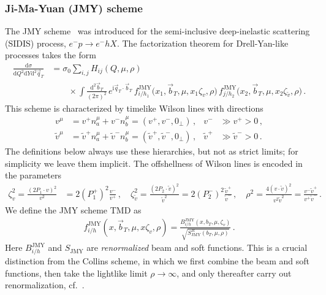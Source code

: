 \documentclass[11pt,a4paper]{article}
\newcommand{\df}{\mathrm{d}}
\newcommand{\img}{\mathrm{i}}
\newcommand{\nn}{\nonumber}
\newcommand{\bt}{\vec b_T}
\newcommand{\qt}{\vec q_T}
\newcommand{\tv}{{\tilde v}}
\newcommand{\na}{n_a}
\newcommand{\nb}{n_b}
\newcommand{\JMY}{\mathrm{JMY}}
\begin{document}
\subsubsection{Ji-Ma-Yuan (JMY) scheme}
\label{sec:jmy-scheme}

The JMY scheme~\cite{Ji:2004wu} was introduced for the semi-inclusive deep-inelastic scattering (SIDIS) process, $e^- p \to e^- hX$. 
The factorization theorem  for Drell-Yan-like processes takes the form
\begin{align} \label{eq:fact_thm_JMY}
 \frac{\df\sigma}{\df Q^2 \df Y \df^2\qt} &
 = \sigma_0 \sum_{i,j} H_{ij}(Q, \mu,\rho)
  \\
   &\qquad \times 
   \int\!\frac{\df^2\bt}{(2\pi)^2} \, e^{\img \qt \cdot \bt} \,
   f_{i/h_1}^\mathrm{JMY}\bigl(x_1, \bt, \mu, x_1 \zeta_v, \rho\bigr) \, f_{j/h_2}^\mathrm{JMY}\bigl(x_2, \bt, \mu, x_2 \zeta_{\tilde v},\rho \bigr)
\,.\nn
\end{align}
This scheme is characterized by timelike Wilson lines with directions
\begin{align}
 v^\mu &= v^+ \na^\mu + v^- \nb^\mu = (v^+, v^-, 0_\perp) \,,
 & v^-& \gg v^+ >0
\,,\nn\\
 \tv^\mu &= \tv^+ \na^\mu + \tv^- \nb^\mu = (\tv^+, \tv^-, 0_\perp)  \,,
  & \tilde v^+ & \gg \tilde v^- >0
\,.\end{align}
The definitions below always use these hierarchies, but not as strict limits; for simplicity we leave them implicit.
The offshellness of Wilson lines is encoded in the parameters 
\begin{align} \label{eq:def_zeta_v}
  \zeta_v^2 = \frac{(2 P_1 \cdot v)^2}{v^2} &= 2 (P_1^+)^2 \frac{v^-}{v^+}
\,,\quad
 \zeta_\tv^2 = \frac{(2 P_2 \cdot \tv)^2}{\tv^2} = 2 (P_2^-)^2 \frac{\tv^+}{\tv^-}
\,,\quad
 \rho^2
 = \frac{4 (v \cdot \tv)^2}{v^2 \tv^2}
 = \frac{v^- \tv^+}{v^+ \tv^-}
\,.\end{align}
We define the JMY scheme TMD as
\begin{align} \label{eq:def_tmd_JMY_2}
 f^{\JMY}_{i/h}(x, \bt, \mu, x \zeta_v, \rho)
 = \frac{B^{\JMY}_{i/h}(x, b_T, \mu, \zeta_v)}{\sqrt{S_\JMY^R(b_T, \mu, \rho)}}
\,.\end{align}
Here $B^{\JMY}_{i/h}$ and $S_{\JMY}$ are \emph{renormalized} beam and soft functions.
This is a crucial distinction from the Collins scheme, in which we first combine the beam and soft functions, then take the lightlike limit $\rho\to\infty$, and only thereafter carry out renormalization, cf.~.
\end{document}
